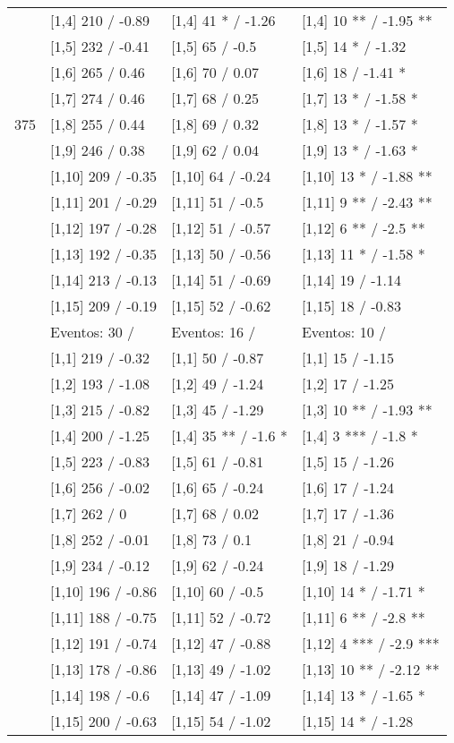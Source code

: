 \begin{table}
\begin{tabular}[t]{llll}
\addlinespace
 & {}[1,4] 210  / -0.89 & {}[1,4] 41 * / -1.26 & {}[1,4] 10 ** / -1.95 **\\
 & {}[1,5] 232  / -0.41 & {}[1,5] 65  / -0.5 & {}[1,5] 14 * / -1.32\\
 & {}[1,6] 265  / 0.46 & {}[1,6] 70  / 0.07 & {}[1,6] 18  / -1.41 *\\
 & {}[1,7] 274  / 0.46 & {}[1,7] 68  / 0.25 & {}[1,7] 13 * / -1.58 *\\
375 & {}[1,8] 255  / 0.44 & {}[1,8] 69  / 0.32 & {}[1,8] 13 * / -1.57 *\\
\addlinespace
 & {}[1,9] 246  / 0.38 & {}[1,9] 62  / 0.04 & {}[1,9] 13 * / -1.63 *\\
 & {}[1,10] 209  / -0.35 & {}[1,10] 64  / -0.24 & {}[1,10] 13 * / -1.88 **\\
 & {}[1,11] 201  / -0.29 & {}[1,11] 51  / -0.5 & {}[1,11] 9 ** / -2.43 **\\
 & {}[1,12] 197  / -0.28 & {}[1,12] 51  / -0.57 & {}[1,12] 6 ** / -2.5 **\\
 & {}[1,13] 192  / -0.35 & {}[1,13] 50  / -0.56 & {}[1,13] 11 * / -1.58 *\\
\addlinespace
 & {}[1,14] 213  / -0.13 & {}[1,14] 51  / -0.69 & {}[1,14] 19  / -1.14\\
 & {}[1,15] 209  / -0.19 & {}[1,15] 52  / -0.62 & {}[1,15] 18  / -0.83\\
 & Eventos:  30 / & Eventos:  16 / & Eventos:  10 /\\
 & {}[1,1] 219  / -0.32 & {}[1,1] 50  / -0.87 & {}[1,1] 15  / -1.15\\
 & {}[1,2] 193  / -1.08 & {}[1,2] 49  / -1.24 & {}[1,2] 17  / -1.25\\
\addlinespace
 & {}[1,3] 215  / -0.82 & {}[1,3] 45  / -1.29 & {}[1,3] 10 ** / -1.93 **\\
 & {}[1,4] 200  / -1.25 & {}[1,4] 35 ** / -1.6 * & {}[1,4] 3 *** / -1.8 *\\
 & {}[1,5] 223  / -0.83 & {}[1,5] 61  / -0.81 & {}[1,5] 15  / -1.26\\
 & {}[1,6] 256  / -0.02 & {}[1,6] 65  / -0.24 & {}[1,6] 17  / -1.24\\
 & {}[1,7] 262  / 0 & {}[1,7] 68  / 0.02 & {}[1,7] 17  / -1.36\\
\addlinespace
500 & {}[1,8] 252  / -0.01 & {}[1,8] 73  / 0.1 & {}[1,8] 21  / -0.94\\
 & {}[1,9] 234  / -0.12 & {}[1,9] 62  / -0.24 & {}[1,9] 18  / -1.29\\
 & {}[1,10] 196  / -0.86 & {}[1,10] 60  / -0.5 & {}[1,10] 14 * / -1.71 *\\
 & {}[1,11] 188  / -0.75 & {}[1,11] 52  / -0.72 & {}[1,11] 6 ** / -2.8 **\\
 & {}[1,12] 191  / -0.74 & {}[1,12] 47  / -0.88 & {}[1,12] 4 *** / -2.9 ***\\
\addlinespace
 & {}[1,13] 178  / -0.86 & {}[1,13] 49  / -1.02 & {}[1,13] 10 ** / -2.12 **\\
 & {}[1,14] 198  / -0.6 & {}[1,14] 47  / -1.09 & {}[1,14] 13 * / -1.65 *\\
 & {}[1,15] 200  / -0.63 & {}[1,15] 54  / -1.02 & {}[1,15] 14 * / -1.28\\
\bottomrule
\end{tabular}
\end{table}
